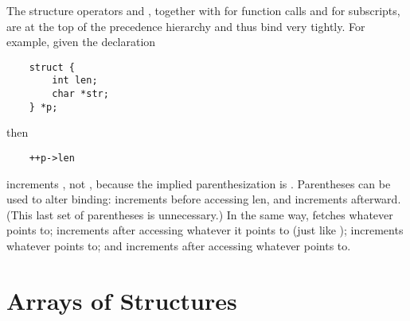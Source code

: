 The structure operators  and \code{->}, together with \code{()} for function calls and \code{[]} for subscripts, are at the top of the precedence hierarchy and thus bind very tightly.
For example, given the declaration
\begin{lstlisting}
	struct {
		int len;
		char *str;
	} *p;
\end{lstlisting}
then
\begin{lstlisting}
	++p->len
\end{lstlisting}
increments , not , because the implied parenthesization is .
Parentheses can be used to alter binding:
 increments  before accessing len, and
 increments  afterward. (This last set of parentheses is unnecessary.)
In the same way,
 fetches whatever  points to;
 increments  after accessing whatever it points to (just like );
 increments whatever  points to; and
 increments  after accessing whatever  points to.



\section{Arrays of Structures}



